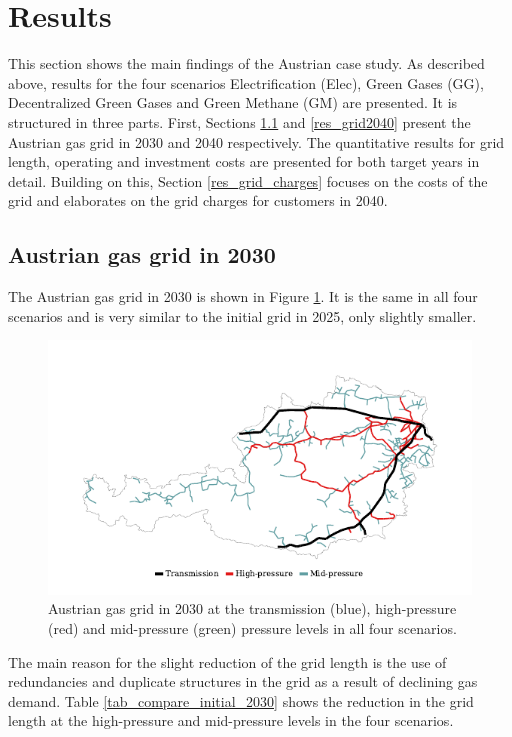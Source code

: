 \section{Results}\label{results}
This section shows the main findings of the Austrian case study. As described above, results for the four scenarios Electrification (Elec), Green Gases (GG), Decentralized Green Gases and Green Methane (GM) are presented. It is structured in three parts. First, Sections \ref{res_grid2030} and \ref{res_grid2040} present the Austrian gas grid in 2030 and 2040 respectively. The quantitative results for grid length, operating and investment costs are presented for both target years in detail. Building on this, Section \ref{res_grid_charges} focuses on the costs of the grid and elaborates on the grid charges for customers in 2040. 

\subsection{Austrian gas grid in 2030}\label{res_grid2030}
The Austrian gas grid in 2030 is shown in Figure \ref{fig_grid_2030}. It is the same in all four scenarios and is very similar to the initial grid in 2025, only slightly smaller. 

\begin{figure}[h]
	\centering
	\includegraphics[width=1\linewidth]{figures/results/gas_grid_2030_all_scenarios_cleaned.pdf}
	\caption{Austrian gas grid in 2030 at the transmission (blue), high-pressure (red) and mid-pressure (green) pressure levels in all four scenarios.}
	\label{fig_grid_2030}
\end{figure}

The main reason for the slight reduction of the grid length is the use of redundancies and duplicate structures in the grid as a result of declining gas demand. Table \ref{tab_compare_initial_2030} shows the reduction in the grid length at the high-pressure and mid-pressure levels in the four scenarios. 

